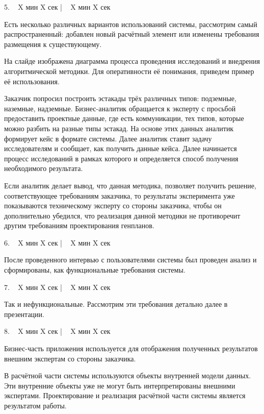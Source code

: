 \documentclass[a4paper,14pt]{extarticle}
\begin{document}
    5. ~ X мин X сек | ~ X мин X сек

    Есть несколько различных вариантов использований системы, рассмотрим самый распространенный:
    добавлен новый расчётный элемент или изменены требования размещения к существующему.

    На слайде изображена диаграмма процесса проведения исследований и
    внедрения алгоритмической методики. Для оперативности её понимания, приведем пример её использования.

    Заказчик попросил построить эстакады трёх различных типов: подземные, наземные, надземные.
    Бизнес-аналитик обращается к эксперту с просьбой предоставить проектные данные, где есть коммуникации,
    тех типов, которые можно разбить на разные типы эстакад.
    На основе этих данных аналитик формирует кейс в формате системы.
    Далее аналитик ставит задачу исследователям и сообщает, как получить данные кейса.
    Далее начинается процесс исследований в рамках которого и определяется способ получения необходимого результата.

    Если аналитик делает вывод, что данная методика, позволяет получить решение, соответствующее требованиям
    заказчика, то результаты эксперимента уже показываются техническому эксперту со стороны заказчика,
    чтобы он дополнительно убедился, что реализация данной методики не противоречит другим требованиям
    проектирования генпланов.

    6. ~ X мин X сек | ~ X мин X сек

    После проведенного интервью с пользователями системы был проведен анализ и сформированы,
    как функциональные требования системы.

    7. ~ X мин X сек | ~ X мин X сек

    Так и нефункциональные.
    Рассмотрим эти требования детально далее в презентации.

    8. ~ X мин X сек | ~ X мин X сек


    Бизнес-часть приложения используется для отображения полученных результатов внешним экспертам со стороны заказчика.

    В расчётной части системы используются объекты внутренней модели данных.
    Эти внутренние объекты уже не могут быть интерпретированы внешними экспертами.
    Проектирование и реализация расчётной части системы является результатом работы.
\end{document}
